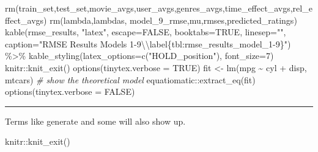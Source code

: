 \documentclass[
]{article}
\newenvironment{Shaded}{}{}
\newcommand{\AttributeTok}[1]{\textcolor[rgb]{0.49,0.56,0.16}{#1}}
\newcommand{\CommentTok}[1]{\textcolor[rgb]{0.38,0.63,0.69}{\textit{#1}}}
\newcommand{\ConstantTok}[1]{\textcolor[rgb]{0.53,0.00,0.00}{#1}}
\newcommand{\DecValTok}[1]{\textcolor[rgb]{0.25,0.63,0.44}{#1}}
\newcommand{\FunctionTok}[1]{\textcolor[rgb]{0.02,0.16,0.49}{#1}}
\newcommand{\NormalTok}[1]{#1}
\newcommand{\OtherTok}[1]{\textcolor[rgb]{0.00,0.44,0.13}{#1}}
\newcommand{\SpecialCharTok}[1]{\textcolor[rgb]{0.25,0.44,0.63}{#1}}
\newcommand{\StringTok}[1]{\textcolor[rgb]{0.25,0.44,0.63}{#1}}
\begin{document}
\begin{Shaded}
\begin{Highlighting}[]
\FunctionTok{rm}\NormalTok{(train\_set,test\_set,movie\_avgs,user\_avgs,genres\_avgs,time\_effect\_avgs,rel\_effect\_avgs)}
\FunctionTok{rm}\NormalTok{(lambda,lambdas, model\_9\_rmse,mu,rmses,predicted\_ratings)}
  \FunctionTok{kable}\NormalTok{(rmse\_results, }\StringTok{"latex"}\NormalTok{, }\AttributeTok{escape=}\ConstantTok{FALSE}\NormalTok{, }\AttributeTok{booktabs=}\ConstantTok{TRUE}\NormalTok{, }\AttributeTok{linesep=}\StringTok{""}\NormalTok{, }\AttributeTok{caption=}\StringTok{"RMSE Results Models 1{-}9}\SpecialCharTok{\textbackslash{}\textbackslash{}}\StringTok{label\{tbl:rmse\_results\_model\_1{-}9\}"}\NormalTok{) }\SpecialCharTok{\%\textgreater{}\%}
    \FunctionTok{kable\_styling}\NormalTok{(}\AttributeTok{latex\_options=}\FunctionTok{c}\NormalTok{(}\StringTok{"HOLD\_position"}\NormalTok{), }\AttributeTok{font\_size=}\DecValTok{7}\NormalTok{)}
\NormalTok{    knitr}\SpecialCharTok{::}\FunctionTok{knit\_exit}\NormalTok{()}
\FunctionTok{options}\NormalTok{(}\AttributeTok{tinytex.verbose =} \ConstantTok{TRUE}\NormalTok{)}
\NormalTok{fit }\OtherTok{\textless{}{-}} \FunctionTok{lm}\NormalTok{(mpg }\SpecialCharTok{\textasciitilde{}}\NormalTok{ cyl }\SpecialCharTok{+}\NormalTok{ disp, mtcars)}
\CommentTok{\# show the theoretical model}
\NormalTok{equatiomatic}\SpecialCharTok{::}\FunctionTok{extract\_eq}\NormalTok{(fit)}
\FunctionTok{options}\NormalTok{(}\AttributeTok{tinytex.verbose =} \ConstantTok{FALSE}\NormalTok{)}
\end{Highlighting}
\end{Shaded}

\begin{center}\rule{0.5\linewidth}{0.5pt}\end{center}

\newpage

Terms like generate and some will also
show up.

\printindex

\begin{Shaded}
\begin{Highlighting}[]
\NormalTok{    knitr}\SpecialCharTok{::}\FunctionTok{knit\_exit}\NormalTok{()}
\end{Highlighting}
\end{Shaded}
\end{document}
